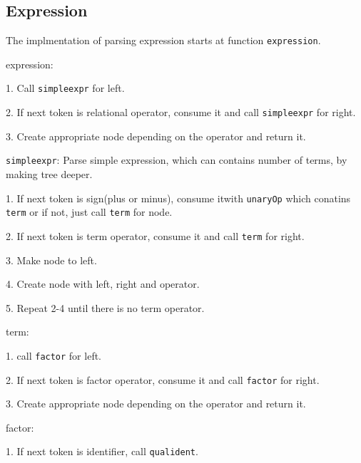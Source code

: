 \documentclass[12pt]{article}
\begin{document}
\subsection{Expression}
\begin{MyIndentedList}
    \item The implmentation of parsing expression starts at function \texttt{expression}.
    \item expression:
    \begin{MyIndentedList}
        \item 1. Call \texttt{simpleexpr} for left.
        \item 2. If next token is relational operator, consume it and call \texttt{simpleexpr} for right.
        \item 3. Create appropriate node depending on the operator and return it.
    \end{MyIndentedList}
    \item \texttt{simpleexpr}: Parse simple expression, which can contains number of terms, by making tree deeper.
    \begin{MyIndentedList}
        \item 1. If next token is sign(plus or minus), consume itwith \texttt{unaryOp} which conatins \texttt{term} or if not, just call \texttt{term} for node.
        \item 2. If next token is term operator, consume it and call \texttt{term} for right.
        \item 3. Make node to left.
        \item 4. Create node with left, right and operator.
        \item 5. Repeat 2-4 until there is no term operator.
    \end{MyIndentedList}
    \item term:
    \begin{MyIndentedList}
        \item 1. call \texttt{factor} for left.
        \item 2. If next token is factor operator, consume it and call \texttt{factor} for right.
        \item 3. Create appropriate node depending on the operator and return it.
    \end{MyIndentedList}
    \item factor:
    \begin{MyIndentedList}
        \item 1. If next token is identifier, call \texttt{qualident}.

\end{MyIndentedList}
\end{MyIndentedList}
\end{document}

